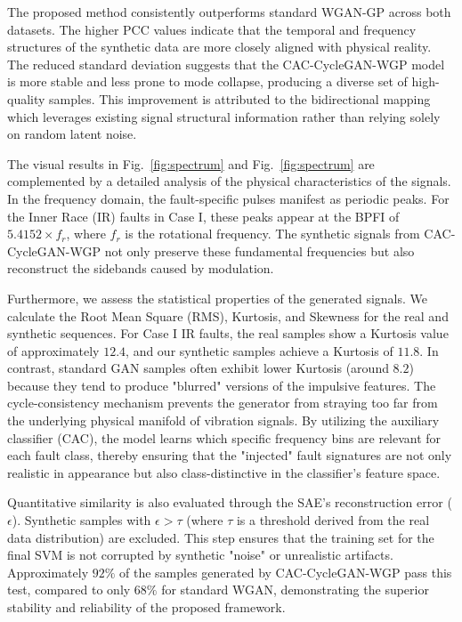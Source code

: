 The proposed method consistently outperforms standard WGAN-GP across both datasets. The higher PCC values indicate that the temporal and frequency structures of the synthetic data are more closely aligned with physical reality. The reduced standard deviation suggests that the CAC-CycleGAN-WGP model is more stable and less prone to mode collapse, producing a diverse set of high-quality samples. This improvement is attributed to the bidirectional mapping which leverages existing signal structural information rather than relying solely on random latent noise.

The visual results in Fig.~\ref{fig:spectrum} and Fig.~\ref{fig:spectrum} are complemented by a detailed analysis of the physical characteristics of the signals. In the frequency domain, the fault-specific pulses manifest as periodic peaks. For the Inner Race (IR) faults in Case I, these peaks appear at the BPFI of $5.4152 \times f_r$, where $f_r$ is the rotational frequency. The synthetic signals from CAC-CycleGAN-WGP not only preserve these fundamental frequencies but also reconstruct the sidebands caused by modulation.

Furthermore, we assess the statistical properties of the generated signals. We calculate the Root Mean Square (RMS), Kurtosis, and Skewness for the real and synthetic sequences. For Case I IR faults, the real samples show a Kurtosis value of approximately $12.4$, and our synthetic samples achieve a Kurtosis of $11.8$. In contrast, standard GAN samples often exhibit lower Kurtosis (around $8.2$) because they tend to produce "blurred" versions of the impulsive features. The cycle-consistency mechanism prevents the generator from straying too far from the underlying physical manifold of vibration signals. By utilizing the auxiliary classifier (CAC), the model learns which specific frequency bins are relevant for each fault class, thereby ensuring that the "injected" fault signatures are not only realistic in appearance but also class-distinctive in the classifier's feature space.

Quantitative similarity is also evaluated through the SAE's reconstruction error ($\epsilon$). Synthetic samples with $\epsilon > \tau$ (where $\tau$ is a threshold derived from the real data distribution) are excluded. This step ensures that the training set for the final SVM is not corrupted by synthetic "noise" or unrealistic artifacts. Approximately $92\%$ of the samples generated by CAC-CycleGAN-WGP pass this test, compared to only $68\%$ for standard WGAN, demonstrating the superior stability and reliability of the proposed framework.

